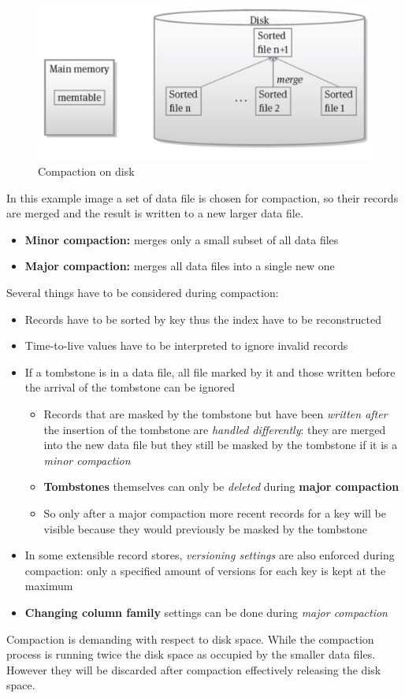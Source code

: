 \begin{figure}[!hbp]
    \centering
    \includegraphics[width=0.70\linewidth]{images/AdvancedDataManagment/extensible_record_store/comapct.jpeg}
    \caption{Compaction on disk}
\end{figure}

In this example image a set of data file is chosen for compaction, so their records are merged and the result is written to a new larger data file.
\begin{itemize}
    \item \textbf{Minor compaction:} merges only a small subset of all data files
    \item \textbf{Major compaction:} merges all data files into a single new one
\end{itemize}
Several things have to be considered during compaction:
\begin{itemize}
    \item Records have to be sorted by key thus the index have to be reconstructed
    \item Time-to-live values have to be interpreted to ignore invalid records
    \item If a tombstone is in a data file, all file marked by it and those written before the arrival of the tombstone can be ignored
    \begin{itemize}
        \item Records that are masked by the tombstone but have been \textit{written after} the insertion of the tombstone are \textit{handled differently}: they are merged into the new data file but they still be masked by the tombstone if it is a \textit{minor compaction}
        \item \textbf{Tombstones} themselves can only be \textit{deleted} during \textbf{major compaction}
        \item So only after a major compaction more recent records for a key will be visible because they would previously be masked by the tombstone
    \end{itemize}
    \item In some extensible record stores, \textit{versioning settings} are also enforced during compaction: only a specified amount of versions for each key is kept at the maximum
    \item \textbf{Changing column family} settings can be done during \textit{major compaction}
\end{itemize}
Compaction is demanding with respect to disk space. While the compaction process is running twice the disk space as occupied by the smaller data files. However they will be discarded after compaction effectively releasing the disk space.

